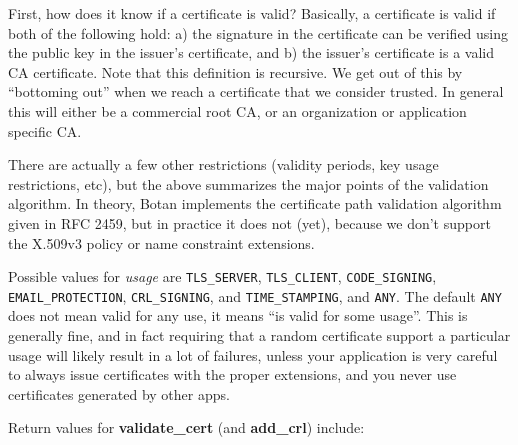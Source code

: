 \documentclass{article}
\newcommand{\function}[1]{\textbf{#1}}
\newcommand{\type}[1]{\texttt{#1}}
\renewcommand{\arg}[1]{\textsl{#1}}
\begin{document}
First, how does it know if a certificate is valid? Basically, a certificate is
valid if both of the following hold: a) the signature in the certificate can be
verified using the public key in the issuer's certificate, and b) the issuer's
certificate is a valid CA certificate. Note that this definition is
recursive. We get out of this by ``bottoming out'' when we reach a certificate
that we consider trusted. In general this will either be a commercial root CA,
or an organization or application specific CA.

There are actually a few other restrictions (validity periods, key usage
restrictions, etc), but the above summarizes the major points of the validation
algorithm. In theory, Botan implements the certificate path validation
algorithm given in RFC 2459, but in practice it does not (yet), because we
don't support the X.509v3 policy or name constraint extensions.

Possible values for \arg{usage} are \type{TLS\_SERVER}, \type{TLS\_CLIENT},
\type{CODE\_SIGNING}, \type{EMAIL\_PROTECTION}, \type{CRL\_SIGNING}, and
\type{TIME\_STAMPING}, and \type{ANY}. The default \type{ANY} does not mean
valid for any use, it means ``is valid for some usage''. This is generally
fine, and in fact requiring that a random certificate support a particular
usage will likely result in a lot of failures, unless your application is very
careful to always issue certificates with the proper extensions, and you never
use certificates generated by other apps.

Return values for \function{validate\_cert} (and \function{add\_crl}) include:
\end{document}
